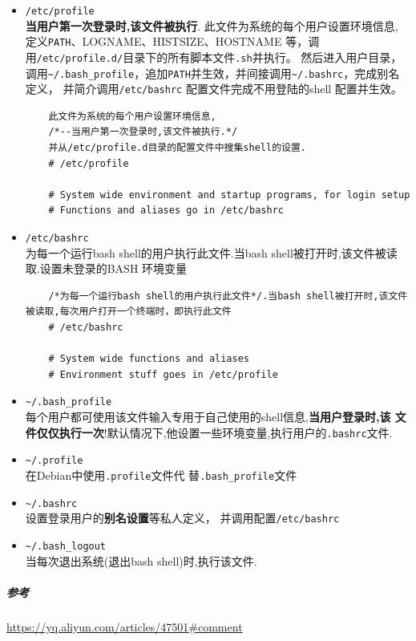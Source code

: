 \documentclass[UTF8,a4paper,12pt]{ctexbook}
\begin{document}
				\begin{itemize}
					\item \verb|/etc/profile| \\ \textbf{当用户第一次登录时,该文件被执行}. 此文件为系统的每个用户设置环境信息,
					定义\verb|PATH|、LOGNAME、HISTSIZE、HOSTNAME 等，调用\verb|/etc/profile.d/|目录下的所有脚本文件\verb|.sh|并执行。 然后进入用户目录，调用\verb|~/.bash_profile|，追加\verb|PATH|并生效，并间接调用\verb|~/.bashrc|，完成别名定义， 并简介调用\verb|/etc/bashrc| 配置文件完成不用登陆的shell 配置并生效。
					
					\begin{lstlisting}
	此文件为系统的每个用户设置环境信息,
	/*--当用户第一次登录时,该文件被执行.*/
	并从/etc/profile.d目录的配置文件中搜集shell的设置.
	# /etc/profile
	
	# System wide environment and startup programs, for login setup
	# Functions and aliases go in /etc/bashrc
					\end{lstlisting}
					\item \verb|/etc/bashrc| \\
					为每一个运行bash shell的用户执行此文件.当bash shell被打开时,该文件被读取.设置未登录的BASH 环境变量
					
					\begin{lstlisting}
	/*为每一个运行bash shell的用户执行此文件*/.当bash shell被打开时,该文件被读取,每次用户打开一个终端时，即执行此文件
	# /etc/bashrc
	
	# System wide functions and aliases
	# Environment stuff goes in /etc/profile
					\end{lstlisting}
					\item \verb|~/.bash_profile| \\
					每个用户都可使用该文件输入专用于自己使用的shell信息,\textbf{当用户登录时,该
					文件仅仅执行一次}!默认情况下,他设置一些环境变量,执行用户的\verb|.bashrc|文件.
					\item \verb|~/.profile| \\在Debian中使用\verb|.profile|文件代 替\verb|.bash_profile|文件			
					\item \verb|~/.bashrc| \\
					设置登录用户的\textbf{别名设置}等私人定义， 并调用配置\verb|/etc/bashrc|
					\item \verb|~/.bash_logout| \\ 当每次退出系统(退出bash shell)时,执行该文件. 
				\end{itemize}	
				
			\subparagraph{参考}\url{https://yq.aliyun.com/articles/47501#comment}
\end{document}
